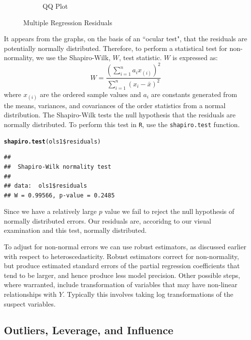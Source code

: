 \documentclass[11pt,openany]{book}\usepackage[]{graphicx}\usepackage[]{color}
\makeatletter
\newcommand{\hlopt}[1]{\textcolor[rgb]{0,0,0}{#1}}%
\newcommand{\hlstd}[1]{\textcolor[rgb]{0.345,0.345,0.345}{#1}}%
\newcommand{\hlkwd}[1]{\textcolor[rgb]{0.737,0.353,0.396}{\textbf{#1}}}%
\newenvironment{kframe}{%
 \def\at@end@of@kframe{}%
 \ifinner\ifhmode%
  \def\at@end@of@kframe{\end{minipage}}%
  \begin{minipage}{\columnwidth}%
 \fi\fi%
 \def\FrameCommand##1{\hskip\@totalleftmargin \hskip-\fboxsep
 \colorbox{shadecolor}{##1}\hskip-\fboxsep
     \hskip-\linewidth \hskip-\@totalleftmargin \hskip\columnwidth}%
 \MakeFramed {\advance\hsize-\width
   \@totalleftmargin\z@ \linewidth\hsize
   \@setminipage}}%
 {\par\unskip\endMakeFramed%
 \at@end@of@kframe}
\newenvironment{knitrout}{}{} %
\renewenvironment{knitrout}{\begin{singlespace}}{\end{singlespace}}
\makeatother
\begin{document}
\begin{figure}
\begin{subfigure}[b]{0.4\textwidth}
                \caption{QQ Plot \label{fig:multresidqq}}
        \end{subfigure}
        \caption{Multiple Regression Residuals}
\end{figure}


It appears from the graphs, on the basis of an ``ocular test", that the residuals are potentially normally distributed.  Therefore, to perform a statistical test for non-normality, we use the Shapiro-Wilk, $W$, test statistic. $W$ is expressed as: 
\begin{equation}
  \label{eq:sw}
  W = \frac{(\sum_{i=1}^{n} a_i x_{(i)})^{2}}{\sum_{i=1}^{n} (x_i-\bar{x})^{2}}
\end{equation}
\noindent where $x_{(i)}$ are the ordered sample values and $a_i$ are constants generated from the means, variances, and covariances of the order statistics from a normal distribution. 
The Shapiro-Wilk tests the null hypothesis that the residuals are normally distributed. To perform this test in \texttt{R}, use the \texttt{shapiro.test} function.   
\begin{knitrout}
\color{fgcolor}\begin{kframe}
\begin{alltt}
\hlkwd{shapiro.test}\hlstd{(ols1}\hlopt{\$}\hlstd{residuals)}
\end{alltt}
\begin{verbatim}
## 
## 	Shapiro-Wilk normality test
## 
## data:  ols1$residuals
## W = 0.99566, p-value = 0.2485
\end{verbatim}
\end{kframe}
\end{knitrout}
\noindent Since we have a relatively large $p$ value we fail to reject the null hypothesis of normally distributed errors.  Our residuals are, accoridng to our visual examination and this test, normally distributed. 

To adjust for non-normal errors we can use robust estimators, as discussed earlier with respect to heteroscedasticity. Robust estimators correct for non-normality, but produce estimated standard errors of the partial regression coefficients that tend to be larger, and hence produce less model precision. Other possible steps, where warranted, include transformation of variables that may have non-linear relationships with $Y$. Typically this involves taking log transformations of the suspect variables. 

\subsection{Outliers, Leverage, and Influence} 
\end{document}
